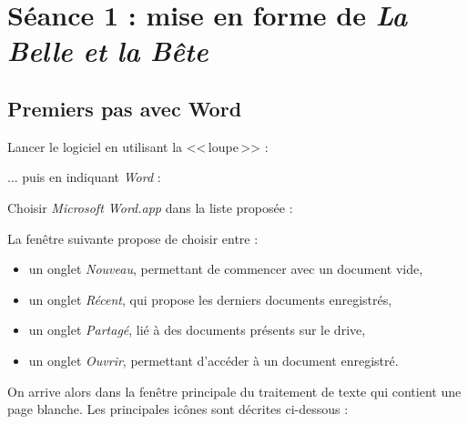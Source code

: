 \newpage





%
%
%
%




\section{Séance 1 : mise en forme de \emph{La Belle et la Bête}}

\subsection{Premiers pas avec Word}

Lancer le logiciel en utilisant la <<\,loupe\,>> :


... puis en indiquant \emph{Word} :


Choisir \emph{Microsoft Word.app} dans la liste proposée :


La fenêtre suivante propose de choisir entre :
\begin{itemize}
\item un onglet \emph{Nouveau}, permettant de commencer avec un document vide,
\item un onglet \emph{Récent}, qui propose les derniers documents enregistrés,
\item un onglet \emph{Partagé}, lié à des documents présents sur le drive,
\item un onglet \emph{Ouvrir}, permettant d'accéder à un document enregistré.
\end{itemize}


On arrive alors dans la fenêtre principale du traitement de texte qui contient une page blanche. Les principales icônes sont décrites ci-dessous :







